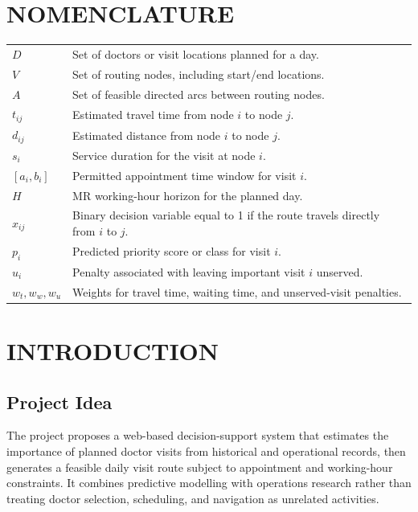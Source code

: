 \documentclass[12pt,a4paper,oneside]{report}
\begin{document}
\chapter*{NOMENCLATURE}
\begin{longtable}{p{28mm}p{100mm}}
$D$ & Set of doctors or visit locations planned for a day.\\
$V$ & Set of routing nodes, including start/end locations.\\
$A$ & Set of feasible directed arcs between routing nodes.\\
$t_{ij}$ & Estimated travel time from node $i$ to node $j$.\\
$d_{ij}$ & Estimated distance from node $i$ to node $j$.\\
$s_i$ & Service duration for the visit at node $i$.\\
$[a_i,b_i]$ & Permitted appointment time window for visit $i$.\\
$H$ & MR working-hour horizon for the planned day.\\
$x_{ij}$ & Binary decision variable equal to 1 if the route travels directly from $i$ to $j$.\\
$p_i$ & Predicted priority score or class for visit $i$.\\
$u_i$ & Penalty associated with leaving important visit $i$ unserved.\\
$w_t,w_w,w_u$ & Weights for travel time, waiting time, and unserved-visit penalties.\\
\end{longtable}

\clearpage
{}
\chapter{INTRODUCTION}

\section{Project Idea}
The project proposes a web-based decision-support system that estimates the importance of planned doctor visits from historical and operational records, then generates a feasible daily visit route subject to appointment and working-hour constraints. It combines predictive modelling with operations research rather than treating doctor selection, scheduling, and navigation as unrelated activities.
\end{document}
